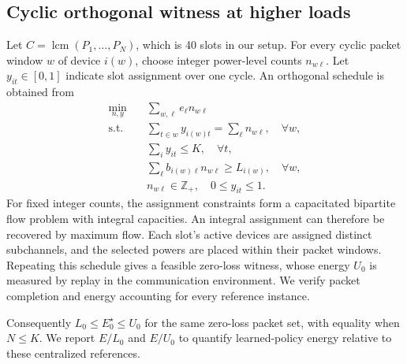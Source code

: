 \subsection{Cyclic orthogonal witness at higher loads}
Let $C=\operatorname{lcm}(P_1,\ldots,P_N)$, which is 40 slots in our setup.
For every cyclic packet window $w$ of device $i(w)$, choose integer power-level
counts $n_{w\ell}$. Let $y_{it}\in[0,1]$ indicate slot assignment over one cycle.
An orthogonal schedule is obtained from
\begin{align}
\min_{n,y}\quad &\sum_{w,\ell}e_\ell n_{w\ell}\label{eq:cycle}\\
\text{s.t.}\quad
 &\sum_{t\in w}y_{i(w)t}=\sum_\ell n_{w\ell},\quad \forall w,\nonumber\\
 &\sum_i y_{it}\le K,\quad \forall t,\nonumber\\
 &\sum_\ell b_{i(w)\ell}n_{w\ell}\ge L_{i(w)},\quad\forall w,\nonumber\\
 &n_{w\ell}\in\mathbb Z_+,\quad 0\le y_{it}\le1.\nonumber
\end{align}
For fixed integer counts, the assignment constraints form a capacitated
bipartite flow problem with integral capacities. An integral assignment can
therefore be recovered by maximum flow. Each slot's active devices are assigned
distinct subchannels, and the selected powers are placed within their packet
windows. Repeating this schedule gives a feasible zero-loss witness, whose
energy $U_0$ is measured by replay in the communication environment. We verify
packet completion and energy accounting for every reference instance.

Consequently $L_0\le E_0^\star\le U_0$ for the same zero-loss packet set,
with equality when $N\le K$. We report $E/L_0$ and $E/U_0$ to quantify
learned-policy energy relative to these centralized references.
